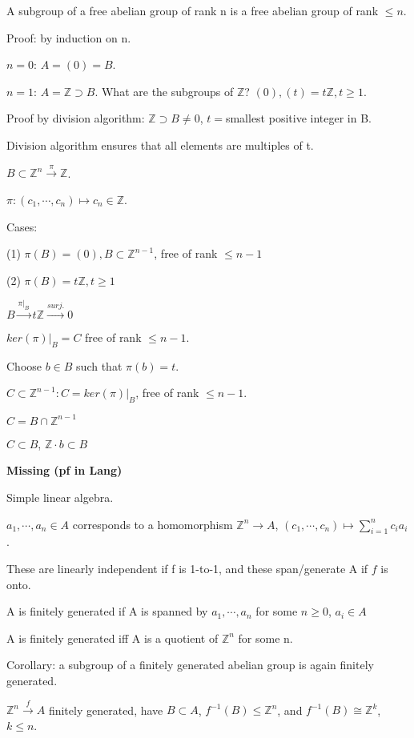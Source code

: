 \documentclass[12pt]{article}
\begin{document}
\noindent
A subgroup of a free abelian group of rank n is a free abelian group of rank $\leq n$.

\noindent
Proof: by induction on n.

$n = 0$: $A = (0) = B$.

$n = 1$: $A = \mathds{Z} \supset B$.  What are the subgroups of $\mathds{Z}$? $(0), (t) = t\mathds{Z}, t \geq 1$.

Proof by division algorithm: $\mathds{Z} \supset B \neq 0$, $t = $smallest positive integer in B.

Division algorithm ensures that all elements are multiples of t.

$B \subset \mathds{Z}^n \xrightarrow{\pi} \mathds{Z}$.

$\pi: (c_1, \cdots, c_n) \mapsto c_n \in \mathds{Z}$.

\noindent
Cases:

(1) $\pi(B) = (0), B \subset \mathds{Z}^{n-1}$, free of rank $\leq n - 1$

(2) $\pi(B) = t\mathds{Z}, t \geq 1$

$B \xrightarrow{\pi|_B} t\mathds{Z} \xrightarrow{surj.} 0$

$ker(\pi)|_B = C$ free of rank $\leq n - 1$.

Choose $b \in B$ such that $\pi(b) = t$.

$C \subset \mathds{Z}^{n-1}: C = ker(\pi)|_B$, free of rank $\leq n - 1$.

$C = B \cap \mathds{Z}^{n - 1}$

$C \subset B$, $\mathds{Z} \cdot b \subset B$

\textbf{Missing (pf in Lang)}

\noindent
Simple linear algebra.

$a_1, \cdots, a_n \in A$ corresponds to a homomorphism $\mathds{Z}^n \to A$, $(c_1, \cdots, c_n) \mapsto \sum_{i = 1}^n c_ia_i$.

These are linearly independent if f is 1-to-1, and these span/generate A if $f$ is onto.

A is finitely generated if A is spanned by $a_1, \cdots, a_n$ for some $n \geq 0$, $a_i \in A$

A is finitely generated iff A is a quotient of $\mathds{Z}^n$ for some n.

\noindent
Corollary: a subgroup of a finitely generated abelian group is again finitely generated.

$\mathds{Z}^n \xrightarrow{f} A$ finitely generated, have $B \subset A$, $f^{-1}(B) \leq \mathds{Z}^n$, and $f^{-1}(B) \cong \mathds{Z}^k$, $k \leq n$.\\
\end{document}
